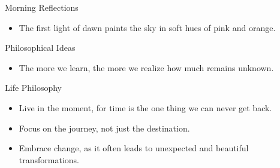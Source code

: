 \begin{skills}
    \skill
    {Morning Reflections}
    {
    \begin{itemize}
    \item {The first light of dawn paints the sky in soft hues of pink and orange.}
    \end{itemize}
    }
    \skill
    {Philosophical Ideas}
    {
    \begin{itemize}
    \item {The more we learn, the more we realize how much remains unknown.}
    \end{itemize}
    }
    \skill
    {Life Philosophy}
    {
    \begin{itemize}
    \item {Live in the moment, for time is the one thing we can never get back.}
    \item {Focus on the journey, not just the destination.}
    \item {Embrace change, as it often leads to unexpected and beautiful transformations.}
    \end{itemize}
    }
\end{skills}
